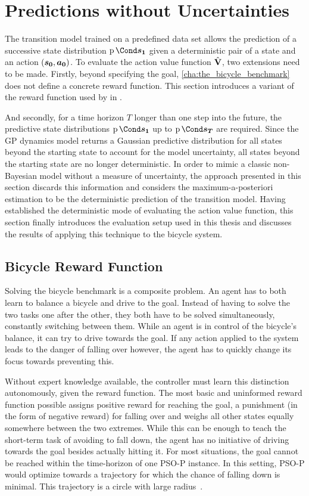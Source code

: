 \section{Predictions without Uncertainties}
The transition model trained on a predefined data set allows the prediction of a successive state distribution $\Prob{\mat{s_1}}$ given a deterministic pair of a state and an action $(\bm{s_0}, \bm{a_0})$.
To evaluate the action value function $\operatorname{\hat{\operatorname{\mathbf{V}}}}$, two extensions need to be made.
Firstly, beyond specifying the goal, \cref{cha:the_bicycle_benchmark} does not define a concrete reward function.
This section introduces a variant of the reward function used by \citeauthor{randlov_learning_1998} in \cite{randlov_learning_1998}.

And secondly, for a time horizon $T$ longer than one step into the future, the predictive state distributions $\Prob{\mat{s_1}}$ up to $\Prob{\mat{s_T}}$ are required.
Since the GP dynamics model returns a Gaussian predictive distribution for all states beyond the starting state to account for the model uncertainty, all states beyond the starting state are no longer deterministic.
In order to mimic a classic non-Bayesian model without a measure of uncertainty, the approach presented in this section discards this information and considers the maximum-a-posteriori estimation to be the deterministic prediction of the transition model.
Having established the deterministic mode of evaluating the action value function, this section finally introduces the evaluation setup used in this thesis and discusses the results of applying this technique to the bicycle system.

\subsection{Bicycle Reward Function}
\label{sub:reward_function}
Solving the bicycle benchmark is a composite problem.
An agent has to both learn to balance a bicycle and drive to the goal.
Instead of having to solve the two tasks one after the other, they both have to be solved simultaneously, constantly switching between them.
While an agent is in control of the bicycle's balance, it can try to drive towards the goal.
If any action applied to the system leads to the danger of falling over however, the agent has to quickly change its focus towards preventing this.

Without expert knowledge available, the controller must learn this distinction autonomously, given the reward function.
The most basic and uninformed reward function possible assigns positive reward for reaching the goal, a punishment (in the form of negative reward) for falling over and weighs all other states equally somewhere between the two extremes.
While this can be enough to teach the short-term task of avoiding to fall down, the agent has no initiative of driving towards the goal besides actually hitting it.
For most situations, the goal cannot be reached within the time-horizon of one PSO-P instance.
In this setting, PSO-P would optimize towards a trajectory for which the chance of falling down is minimal.
This trajectory is a circle with large radius~\cite{randlov_learning_1998}.

